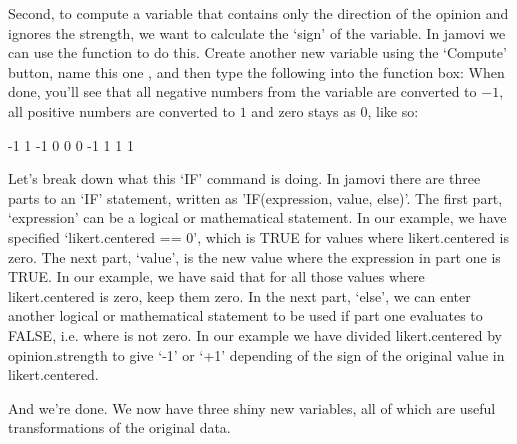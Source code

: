 \noindent
Second, to compute a variable that contains only the direction of the opinion and ignores the strength, we want to calculate the `sign' of the variable. In jamovi we can use the  function to do this. Create another new variable using the `Compute' button, name this one , and then type the following into the function box: 
When done, you'll see that all negative numbers from the  variable are converted to $-1$, all positive numbers are converted to $1$ and zero stays as $0$, like so: 
\begin{rblock1}
-1  1 -1  0  0  0 -1  1  1  1
\end{rblock1}
Let's break down what this `IF' command is doing. In jamovi there are three parts to an `IF' statement, written as 'IF(expression, value, else)'. The first part, `expression' can be a logical or mathematical statement. In our example, we have specified `likert.centered == 0', which is TRUE for values where likert.centered is zero. The next part, `value', is the new value where the expression in part one is TRUE. In our example, we have said that for all those values where likert.centered is zero, keep them zero. In the next part, `else', we can enter another logical or mathematical statement to be used if part one evaluates to FALSE, i.e. where  is not zero. In our example we have divided likert.centered by opinion.strength to give `-1' or `+1' depending of the sign of the original value in likert.centered.

And we're done. We now have three shiny new variables, all of which are useful transformations of the original  data. 


